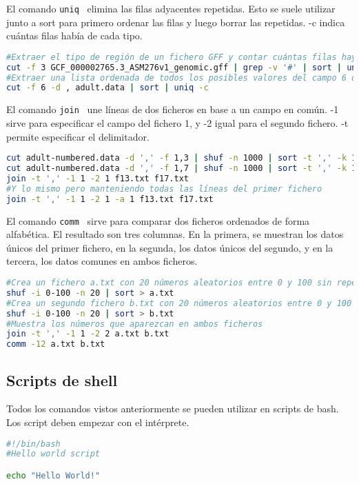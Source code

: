  El comando \texttt{uniq}  \ elimina las filas adyacentes repetidas. Esto se suele utilizar junto a sort para primero ordenar las filas y luego borrar las repetidas. -c indica cuántas filas había de cada tipo. 
\begin{lstlisting}[language=bash]
#Extraer el tipo de región de un fichero GFF y contar cuántas filas hay de cada tipo
cut -f 3 GCF_000002765.3_ASM276v1_genomic.gff | grep -v '#' | sort | uniq -c
#Extraer una lista ordenada de todos los posibles valores del campo 6 de adult.data
cut -f 6 -d , adult.data | sort | uniq -c
\end{lstlisting}

El comando \texttt{join}  \ une líneas de dos ficheros en base a un campo en común. -1 sirve para especificar el campo del fichero 1, y -2 igual para el segundo fichero. -t permite especificar el delimitador.
\begin{lstlisting}[language=bash]
cut adult-numbered.data -d ',' -f 1,3 | shuf -n 1000 | sort -t ',' -k 1,1 > f13.txt
cut adult-numbered.data -d ',' -f 1,7 | shuf -n 1000 | sort -t ',' -k 1,1 > f17.txt
join -t ',' -1 1 -2 1 f13.txt f17.txt
#Y lo mismo pero manteniendo todas las líneas del primer fichero
join -t ',' -1 1 -2 1 -a 1 f13.txt f17.txt
\end{lstlisting}

El comando \texttt{comm}  \ sirve para comparar dos ficheros ordenados de forma alfabética. El resultado son tres columnas. En la primera, se muestran los datos únicos del primer fichero, en la segunda, los datos únicos del segundo, y en la tercera, los datos comunes en ambos ficheros. 

\begin{lstlisting}[language=bash]
#Crea un fichero a.txt con 20 números aleatorios entre 0 y 100 sin repetir; cada número debe estar en una línea distinta
shuf -i 0-100 -n 20 | sort > a.txt
#Crea un segundo fichero b.txt con 20 números aleatorios entre 0 y 100 sin repetir; cada número debe estar en una línea distinta
shuf -i 0-100 -n 20 | sort > b.txt
#Muestra los números que aparezcan en ambos ficheros
join -t ',' -1 1 -2 2 a.txt b.txt
comm -12 a.txt b.txt
\end{lstlisting}

\subsection{Scripts de shell}
Todos los comandos vistos anteriormente se pueden utilizar en scripts de bash. Los script deben empezar con el intérprete.
\begin{lstlisting}[language=bash]
#!/bin/bash
#Hello world script

echo "Hello World!"
\end{lstlisting}


